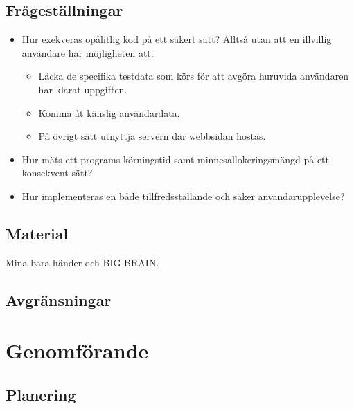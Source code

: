 \documentclass{article}
\begin{document}
\subsection{Frågeställningar}

\begin{itemize}
	\item Hur exekveras opålitlig kod på ett säkert sätt? Alltså utan att en
		illvillig användare har möjligheten att:
		\begin{itemize}
			\item Läcka de specifika testdata som körs för att avgöra huruvida
				användaren har klarat uppgiften.
			\item Komma åt känslig användardata.
			\item På övrigt sätt utnyttja servern där webbsidan hostas.
		\end{itemize}
	\item
		Hur mäts ett programs körningstid samt minnesallokeringsmängd på ett
		konsekvent sätt?
	\item
		Hur implementeras en både tillfredsställande och säker
		användarupplevelse?

\end{itemize}


\subsection{Material}

Mina bara händer och BIG BRAIN.

\subsection{Avgränsningar}


\section{Genomförande}

\subsection{Planering}
\end{document}
